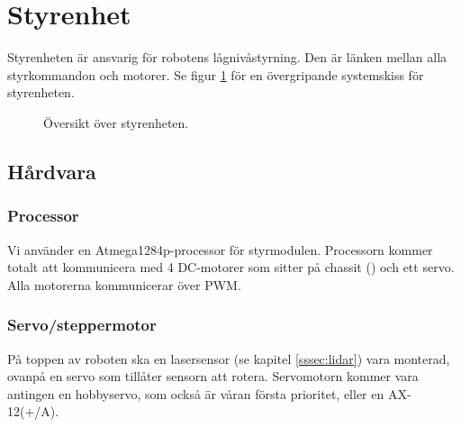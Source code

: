 \documentclass[a4paper,11pt]{article}
\begin{document}
\newpage
\section{Styrenhet} \label{sec:system2}
Styrenheten är ansvarig för robotens lågnivåstyrning. Den är länken mellan alla styrkommandon och motorer. Se figur \ref{fig:unitMotorcontroller} för en övergripande systemskiss för styrenheten.

\begin{figure}[h!]
    \caption{Översikt över styrenheten.}
    \label{fig:unitMotorcontroller}
\end{figure}

\subsection{Hårdvara}

\subsubsection{Processor}
Vi använder en Atmega1284p-processor för styrmodulen. Processorn kommer totalt att kommunicera med 4 DC-motorer som sitter på chassit (\cite{terminator}) och ett servo. Alla motorerna kommunicerar över PWM.

\subsubsection{Servo/steppermotor} \label{ssec:servomotor}
På toppen av roboten ska en lasersensor (se kapitel \ref{sssec:lidar}) vara monterad, ovanpå en servo som tillåter sensorn att rotera. Servomotorn kommer vara antingen en hobbyservo, som också är våran första prioritet, eller en AX-12(+/A).
\end{document}
